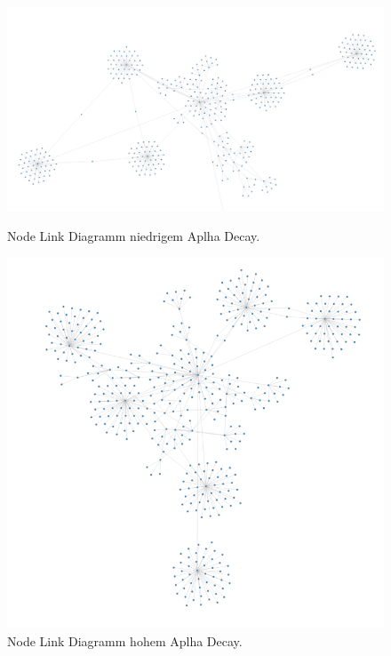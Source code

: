 \begin{figure}
    \centering
    \begin{minipage}{.5\textwidth}
        \centering
        \includegraphics[width=1\linewidth]{images/03/NodeLinkLowAlpha.png}
        \caption{Node Link Diagramm niedrigem Aplha Decay.}
        \label{fig:realization:implementation:NodeLinkLowAlpha}
    \end{minipage}%
    \begin{minipage}{.5\textwidth}
        \centering
        \includegraphics[width=1\linewidth]{images/03/NodeLinkHighAlpha.png}
        \caption{Node Link Diagramm hohem Aplha Decay.}
        \label{fig:realization:implementation:NodeLinkHighAlpha}
    \end{minipage}
\end{figure}


